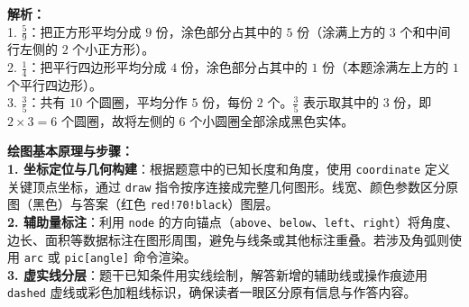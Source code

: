 \documentclass[12pt, a4paper]{ctexrep}
\begin{document}
\begin{center}
\end{center}

\vspace{0.6cm}
{\small\color{gray}
\textbf{解析：}\\
1. $\frac{5}{9}$：把正方形平均分成 $9$ 份，涂色部分占其中的 $5$ 份（涂满上方的 $3$ 个和中间行左侧的 $2$ 个小正方形）。\\
2. $\frac{1}{4}$：把平行四边形平均分成 $4$ 份，涂色部分占其中的 $1$ 份（本题涂满左上方的 $1$ 个平行四边形）。\\
3. $\frac{3}{5}$：共有 $10$ 个圆圈，平均分作 $5$ 份，每份 $2$ 个。$\frac{3}{5}$ 表示取其中的 $3$ 份，即 $2 \times 3 = 6$ 个圆圈，故将左侧的 $6$ 个小圆圈全部涂成黑色实体。
}

\vspace{0.8cm}


\vspace{0.6cm}

{\small\color{blue!70!black}
\textbf{绘图基本原理与步骤：}\\
\textbf{1. 坐标定位与几何构建}：根据题意中的已知长度和角度，使用 \texttt{coordinate} 定义关键顶点坐标，通过 \texttt{draw} 指令按序连接成完整几何图形。线宽、颜色参数区分原图（黑色）与答案（红色 \texttt{red!70!black}）图层。\\
\textbf{2. 辅助量标注}：利用 \texttt{node} 的方向锚点（\texttt{above}、\texttt{below}、\texttt{left}、\texttt{right}）将角度、边长、面积等数据标注在图形周围，避免与线条或其他标注重叠。若涉及角弧则使用 \texttt{arc} 或 \texttt{pic[angle]} 命令渲染。\\
\textbf{3. 虚实线分层}：题干已知条件用实线绘制，解答新增的辅助线或操作痕迹用 \texttt{dashed} 虚线或彩色加粗线标识，确保读者一眼区分原有信息与作答内容。
}
\end{document}
